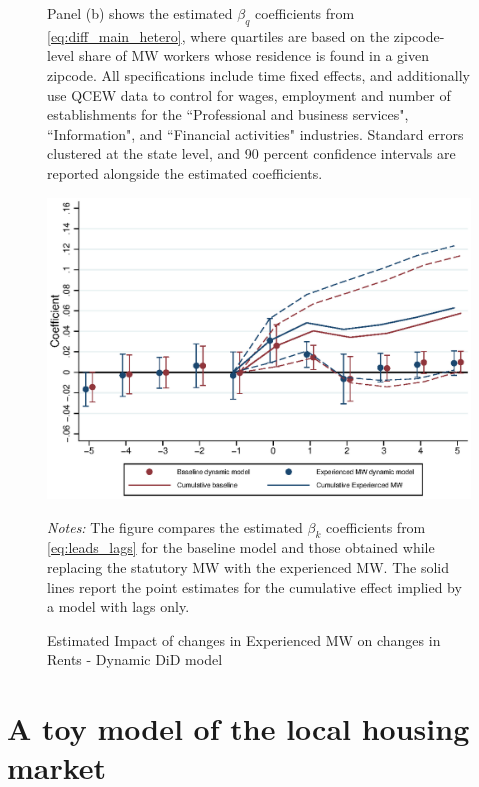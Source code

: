 \begin{figure}[htb!]
\begin{minipage}{\textwidth}
	Panel (b) shows the estimated $\beta_q$ coefficients from \autoref{eq:diff_main_hetero}, where quartiles are 
	based on the zipcode-level share of MW workers whose residence is found in a given zipcode. 
	All specifications include time fixed effects, 
	and additionally use QCEW data to control for wages, employment and number of establishments 
	for the ``Professional and business services", ``Information", and ``Financial activities" industries.
	Standard errors clustered at the state level, and 90 percent confidence intervals are reported alongside 
	the estimated coefficients. 
\end{minipage}
\end{figure}

\begin{figure}[!h]
	\centering
	\caption{Estimated Impact of changes in Experienced MW on changes in Rents - Dynamic DiD model}
	\label{fig:expmw_dynamic}
	\includegraphics[width = .9\textwidth]{../../analysis/first_differences_expmw/output/fd_model_comparison_expmw.eps}
	\begin{minipage}{.9\textwidth}\footnotesize
		\textit{Notes:} The figure compares the estimated $\beta_{k}$ coefficients from \autoref{eq:leads_lags} for the baseline model and those obtained while replacing the statutory MW with the experienced MW. The solid lines report the point estimates for the cumulative effect implied by a model with lags only.  
	\end{minipage}
\end{figure}

\clearpage
\section{A toy model of the local housing market}\label{sec:model}

